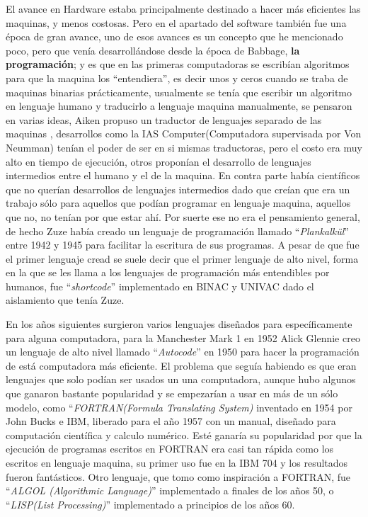 \documentclass[letterpaper,12pt,oneside]{book}
\begin{document}
		El avance en Hardware estaba principalmente destinado a hacer más eficientes las maquinas, y menos costosas. Pero en el apartado del software también
		fue una época de gran avance, uno de esos avances es un concepto que he mencionado poco, pero que venía desarrollándose desde la época de Babbage,
		\textbf{la programación}; y es que en las primeras computadoras se escribían algoritmos para que la maquina los ``entendiera'', es decir unos y ceros
		cuando se traba de maquinas binarias prácticamente, usualmente se tenía que escribir un algoritmo en lenguaje humano y traducirlo a lenguaje maquina
		manualmente, se pensaron en varias ideas, Aiken propuso un traductor de lenguajes separado de las maquinas , desarrollos como la IAS Computer(Computadora supervisada
		por	Von Neumman) tenían el poder de ser en si mismas traductoras, pero el costo era muy alto en tiempo de ejecución,
		otros proponían el desarrollo de lenguajes intermedios entre el humano y el de la maquina. En contra parte había científicos que no
		querían desarrollos de lenguajes intermedios dado que creían que era un trabajo sólo para aquellos que podían programar en lenguaje maquina, aquellos
		que no, no tenían por que estar ahí. Por suerte ese no era el pensamiento general, de hecho Zuze había creado un lenguaje de programación llamado 
		``\textit{Plankalkül}'' entre 1942 y 1945 para facilitar la escritura de sus programas. A pesar de que fue el primer lenguaje cread
		se suele decir que el primer lenguaje de alto nivel, forma en la que se les llama a los lenguajes de programación más entendibles por humanos, fue
		``\textit{shortcode}'' implementado en BINAC y UNIVAC dado el aislamiento que tenía Zuze.
		
		En los años siguientes surgieron varios lenguajes diseñados para específicamente para alguna computadora, para la Manchester Mark 1 en 1952 Alick Glennie creo un
		lenguaje de alto nivel llamado ``\textit{Autocode}'' en 1950 para hacer la programación de está computadora más eficiente. El problema que seguía habiendo es
		que eran lenguajes que solo podían ser usados un una computadora, aunque hubo algunos que ganaron bastante popularidad y se empezarían a usar en más de un sólo
		modelo, como ``\textit{FORTRAN(Formula Translating System)} inventado en 1954 por John Bucks e IBM, liberado para el año 1957 con un manual, diseñado
		para computación científica y calculo numérico. Esté ganaría su popularidad por que la ejecución de programas escritos en FORTRAN era casi tan rápida
		como los escritos en lenguaje maquina, su primer uso fue en la IBM 704 y los resultados fueron fantásticos. Otro lenguaje, que tomo como inspiración
		a FORTRAN, fue ``\textit{ALGOL (Algorithmic Language)}'' implementado a finales de los años 50, o ``\textit{LISP(List Processing)}'' implementado a
		principios de los años 60.
		
\end{document}
